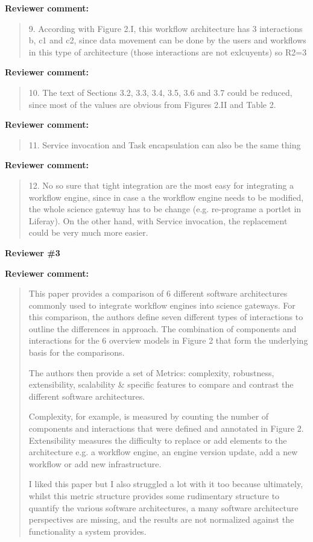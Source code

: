 \documentclass[a4]{letter}
\newenvironment{review}%
{\textbf{Reviewer comment:}\begin{quote}}%
{\end{quote}}%
\begin{document}
\begin{letter}{}
\begin{review}
9. According with Figure 2.I, this workflow architecture has 3
interactions b, c1 and c2, since data movement can be done by the
users and workflows in this type of architecture (those interactions
are not exlcuyents) so R2=3
\end{review}

\begin{review}
  10. The text of Sections 3.2, 3.3, 3.4, 3.5, 3.6 and 3.7 could be
  reduced, since most of the values are obvious from Figures 2.II and
  Table 2.
\end{review}

\begin{review}
  11. Service invocation and Task encapsulation can also be the same
  thing
\end{review}

\begin{review}
12. No so sure that tight integration are the most easy for
integrating a workflow engine, since in case a the workflow engine
needs to be modified, the whole science gateway has to be change
(e.g. re-programe a portlet in Liferay). On the other hand, with
Service invocation, the replacement could be very much more easier.
\end{review}

\textbf{Reviewer \#3}

\begin{review}
This paper provides a comparison of 6 different software architectures commonly used to integrate workflow engines into science gateways. For this comparison, the authors define seven different types of interactions to outline the differences in approach. The combination of components and interactions for the 6 overview models in Figure 2 that form the underlying basis for the comparisons.

The authors then provide a set of Metrics: complexity, robustness, extensibility, scalability \& specific features to compare and contrast the different software architectures.

Complexity, for example, is measured by counting the number of components and interactions that were defined and annotated in Figure 2.  Extensibility measures the difficulty to replace or add elements to the architecture e.g. a workflow engine, an engine version update, add a new workflow or add new infrastructure. 

I liked this paper but I also struggled a lot with it too because ultimately, whilst this metric structure provides some rudimentary structure to quantify the various software architectures, a many software architecture perspectives are missing, and the results are not normalized against the functionality a system provides.


\end{review}
\end{letter}
\end{document}
